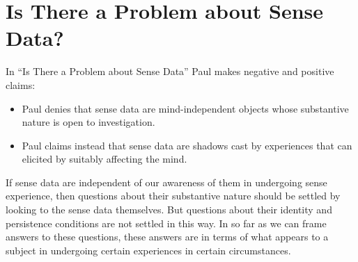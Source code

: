\documentclass[11pt]{article}
\begin{document}

\section{Is There a Problem about Sense Data?} %
\label{sec:is_there_a_problem_about_sense_data_}
In ``Is There a Problem about Sense Data'' Paul makes negative and positive claims:
\begin{itemize}
    \item Paul denies that sense data are mind-independent objects whose substantive nature is open to investigation.
    \item Paul claims instead that sense data are shadows cast by experiences that can elicited by suitably affecting the mind.
\end{itemize}

If sense data are independent of our awareness of them in undergoing sense experience, then questions about their substantive nature should be settled by looking to the sense data themselves. But questions about their identity and persistence conditions are not settled in this way. In so far as we can frame answers to these questions, these answers are in terms of what appears to a subject in undergoing certain experiences in certain circumstances.
\end{document}
